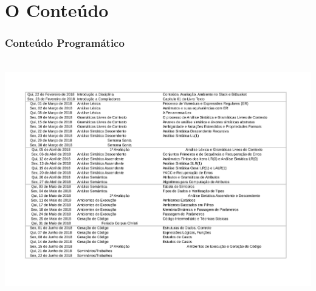 \documentclass[table]{beamer}
\begin{document}
\section{O Conteúdo}
\begin{frame}
   \frametitle{Conteúdo Programático}   
   \hbox{\hspace{-1.35cm} \includegraphics[scale=0.45]{figuras/programa.pdf}} 
\end{frame}
\end{document}
